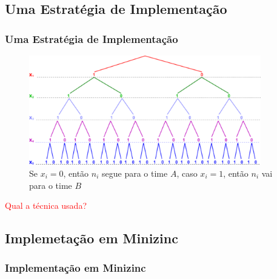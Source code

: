 \documentclass{beamer}
\begin{document}
\subsection{Uma Estratégia de Implementação}

\begin{frame}[fragile]
\frametitle{Uma Estratégia de Implementação}

\begin{figure}[ht!]
 \centering
 \includegraphics[width=0.9\textwidth , height=0.7\textheight]{../figuras/binary_tree04.pdf}
\caption{Se $x_i=0$, então $n_i$ segue para o time $A$, caso  $x_i=1$, então  $n_i$ vai para o time $B$} 
\end{figure}

\vspace{-1cm}
\begin{center}
\textcolor{red}{Qual a técnica  usada?}
\end{center}

\end{frame}

\subsection{Implemetação em Minizinc}

\begin{frame}[fragile]
\frametitle{Implementação em Minizinc}

{\small
}
\end{frame}

\end{document}
